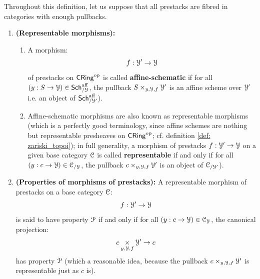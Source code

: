                     \begin{definition} \label{def: affine_schematic}
                        Throughout this definition, let us suppose that all prestacks are fibred in categories with enough pullbacks. 
                            \begin{enumerate}
                                \item \textbf{(Representable morphisms):} 
                                    \begin{enumerate}
                                        \item A morphism:
                                            $$f: \mathcal{Y}' \to \mathcal{Y}$$
                                        of prestacks on $\mathsf{CRing}^{\mathrm{op}}$ is called \textbf{affine-schematic} if for all $(y: S \to \mathcal{Y}) \in \mathsf{Sch}^{\mathrm{aff}}_{/\mathcal{Y}}$, the pullback $S \x_{y, \calY, f} \calY'$ is an affine scheme over $\mathcal{Y}'$ i.e. an object of $\mathsf{Sch}^{\mathrm{aff}}_{/\mathcal{Y}'}$). 
                                        \item Affine-schematic morphisms are also known as representable morphisms (which is a perfectly good terminology, since affine schemes are nothing but representable presheaves on $\mathsf{CRing}^{\mathrm{op}}$; cf. definition \ref{def: zariski_topoi}); in full generality, a morphism of prestacks $f: \mathcal{Y}' \to \mathcal{Y}$ on a given base category $\mathcal{C}$ is called \textbf{representable} if and only if for all $(y: c \to \mathcal{Y}) \in \mathcal{C}_{/\mathcal{Y}}$, the pullback $c \x_{y, \calY, f} \calY'$ is an object of $\mathcal{C}_{/\mathcal{Y}'}$).
                                    \end{enumerate}
                                \item \textbf{(Properties of morphisms of prestacks):} A representable morphism of prestacks on a base category $\mathcal{C}$:
                                    $$f: \mathcal{Y}' \to \mathcal{Y}$$
                                is said to have property $\mathcal{P}$ if and only if for all $(y: c \to \mathcal{Y}) \in \mathcal{C}_{\mathcal{Y}}$, the canonical projection:
                                    $$c \x_{y, \calY, f} \calY' \to c$$
                                has property $\mathcal{P}$ (which a reasonable idea, because the pullback $c \x_{y, \calY, f} \calY'$ is representable just as $c$ is).
                            \end{enumerate}
                    \end{definition}
                
